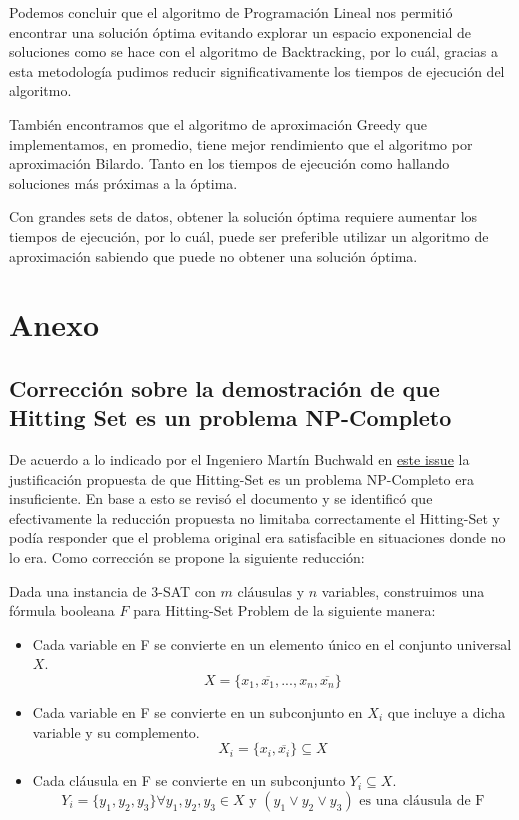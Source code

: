 \documentclass{estilo}
\begin{document}
Podemos concluir que el algoritmo de Programación Lineal nos permitió encontrar una solución óptima evitando explorar un espacio exponencial de soluciones como se hace con el algoritmo de Backtracking, por lo cuál, gracias a esta metodología pudimos reducir significativamente los tiempos de ejecución del algoritmo.

También encontramos que el algoritmo de aproximación Greedy que implementamos, en promedio, tiene mejor rendimiento que el algoritmo por aproximación Bilardo. Tanto en los tiempos de ejecución como hallando soluciones más próximas a la óptima.

Con grandes sets de datos, obtener la solución óptima requiere aumentar los tiempos de ejecución, por lo cuál, puede ser preferible utilizar un algoritmo de aproximación sabiendo que puede no obtener una solución óptima. 

\newpage
\section{Anexo}
\subsection{Corrección sobre la demostración de que Hitting Set es un problema NP-Completo}
De acuerdo a lo indicado por el Ingeniero Martín Buchwald en \href{https://github.com/mrti259/tda-i-tps/issues/2#issuecomment-1858235695}{este issue} la justificación propuesta de que Hitting-Set es un problema NP-Completo era insuficiente. En base a esto se revisó el documento y se identificó que efectivamente la reducción propuesta no limitaba correctamente el Hitting-Set y podía responder que el problema original era satisfacible en situaciones donde no lo era. Como corrección se propone la siguiente reducción:

Dada una instancia de 3-SAT con $m$ cláusulas y $n$ variables, construimos una fórmula booleana \(F\) para Hitting-Set Problem de la siguiente manera:

\begin{itemize}
    \item Cada variable en F se convierte en un elemento único en el conjunto universal \(X\).
    \[X = \{x_1, \overline{x_1}, ..., x_n, \overline{x_n}\}\]
    
    \item Cada variable en F se convierte en un subconjunto en \(X_i\) que incluye a dicha variable y su complemento.
    \[X_i = \{x_i, \overline{x_i}\} \subseteq X\]
    
    \item Cada cláusula en F se convierte en un subconjunto \(Y_i \subseteq X\).
    \[Y_i = \{y_1, y_2, y_3\} \forall y_1, y_2, y_3 \in X \text{ y } (y_1 \lor y_2 \lor y_3) \text{ es una cláusula de F} \]
\end{itemize}
\end{document}
